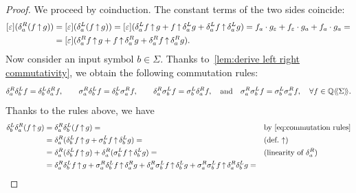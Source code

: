 \begin{proof}
    We proceed by coinduction.
    The constant terms of the two sides coincide:
    \begin{align*}
        [\varepsilon](\delta^R_{a} (f \operatorname{\uparrow} g))
            &= [\varepsilon](\delta^L_{a} (f \operatorname{\uparrow} g))
            = [\varepsilon](\delta^L_{a} f \operatorname{\uparrow} g + f \operatorname{\uparrow} \delta^L_{a} g + \delta^L_{a} f \operatorname{\uparrow} \delta^L_{a} g)
            = f_a \cdot g_\varepsilon + f_\varepsilon \cdot g_a + f_a \cdot g_a = \\
            &= [\varepsilon](\delta^R_{a} f \operatorname{\uparrow} g + f \operatorname{\uparrow} \delta^R_{a} g + \delta^R_{a} f \operatorname{\uparrow} \delta^R_{a} g).
    \end{align*}
    Now consider an input symbol $b \in \Sigma$.
    Thanks to~\cref{lem:derive left right commutativity},
    we obtain the following commutation rules:
    \begin{align}
        \label{eq:commutation rules}
        \delta^R_{a}  \delta^L_{b} f = \delta^L_{b} \delta^R_{a} f,
            \qquad
        \sigma^R_a \delta^L_b f = \delta^L_b \sigma^R_a f,
            \qquad
        \delta^R_a \sigma^L_b f = \sigma^L_b \delta^R_a f,
            \quad\text{and}\quad
        \sigma^R_a \sigma^L_b f = \sigma^L_b \sigma^R_a f,
        \quad \forall f \in \mathbb Q\langle\!\langle\Sigma\rangle\!\rangle.
    \end{align}
    Thanks to the rules above, we have
    \begin{align*}
        \deriveleft b \deriveright a (f \infiltration g)
            &= \deriveright a \deriveleft b (f \infiltration g) =
                &&\text{by~\cref{eq:commutation rules}} \\
            &= \deriveright a (\deriveleft b f \infiltration g + \sigma^L_b f \infiltration \deriveleft b g) =
                &&\text{(def.~$\infiltration$)} \\
            &= \deriveright a (\deriveleft b f \infiltration g) + \deriveright a (\sigma^L_b f \infiltration \deriveleft b g) =
                &&\text{(linearity of $\deriveright a$)} \\
            &=  \deriveright a \deriveleft b f \infiltration g + \sigma^R_a \deriveleft b f \infiltration \deriveright a g
                + \deriveright a \sigma^L_b f \infiltration \deriveleft b g + \sigma^R_a \sigma^L_b f \infiltration \deriveright a \deriveleft b g =

\end{align*}
\end{proof}
